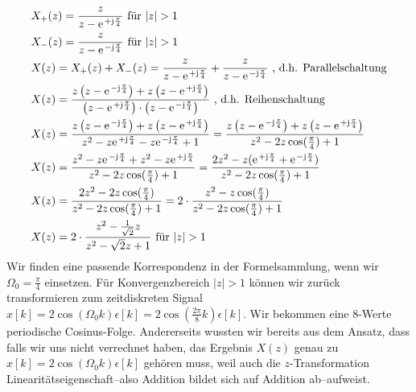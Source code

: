 \begin{ExCalc}
\begin{align}
&X_+(z) = \frac{z}{z-\e^{+\im\frac{\pi}{4}}}\text{ für } |z|>1 \\
&X_-(z) = \frac{z}{z-\e^{-\im\frac{\pi}{4}}}\text{ für } |z|>1 \\
&X(z) = X_+(z) + X_-(z) = \frac{z}{z-\e^{+\im\frac{\pi}{4}}} + \frac{z}{z-\e^{-\im\frac{\pi}{4}}}\text{ , d.h. Parallelschaltung}\\
&X(z) = \frac{z \left(z-\e^{-\im\frac{\pi}{4}}\right) + z \left(z-\e^{+\im\frac{\pi}{4}}\right)}
{\left(z-\e^{+\im\frac{\pi}{4}}\right)\cdot \left(z-\e^{-\im\frac{\pi}{4}}\right)}\text{ , d.h. Reihenschaltung}\\
&X(z)  = \frac{z \left(z-\e^{-\im\frac{\pi}{4}}\right) + z \left(z-\e^{+\im\frac{\pi}{4}}\right)}
{z^2 - z \e^{+\im\frac{\pi}{4}} - z \e^{-\im\frac{\pi}{4}} + 1}=
\frac{z \left(z-\e^{-\im\frac{\pi}{4}}\right) + z \left(z-\e^{+\im\frac{\pi}{4}}\right)}
{z^2 - 2 z \cos(\frac{\pi}{4}) + 1}\\
&X(z) = \frac{z^2 - z \e^{-\im\frac{\pi}{4}} + z^2 - z \e^{+\im\frac{\pi}{4}}}
{z^2 - 2 z \cos(\frac{\pi}{4}) + 1} =
\frac{2 z^2 - z (\e^{+\im\frac{\pi}{4}} + \e^{-\im\frac{\pi}{4}} )}
{z^2 - 2 z \cos(\frac{\pi}{4}) + 1}\\
&X(z) =\frac{2 z^2 - 2 z \cos(\frac{\pi}{4})}{z^2 - 2 z \cos(\frac{\pi}{4}) + 1}=
2 \cdot \frac{z^2 - z \cos(\frac{\pi}{4})}{z^2 - 2 z \cos(\frac{\pi}{4}) + 1}\\
&X(z) = 2 \cdot \frac{z^2-\frac{1}{\sqrt{2}} z}{z^2-\sqrt{2} z +1}\text{ für } |z|>1
\end{align}
%
Wir finden eine passende Korrespondenz in der Formelsammlung, wenn wir
$\Omega_0=\frac{\pi}{4}$ einsetzen. Für Konvergenzbereich $|z|>1$ können wir
zurück transformieren zum zeitdiskreten Signal
$x[k] = 2\cos(\Omega_0 k) \epsilon[k] = 2 \cos(\frac{2\pi}{8} k) \epsilon[k]$.
Wir bekommen eine 8-Werte periodische Cosinus-Folge.
%
Andererseits wussten wir bereits aus dem Ansatz, dass falls wir uns nicht
verrechnet haben, das Ergebnis $X(z)$ genau zu
$x[k] = 2\cos(\Omega_0 k) \epsilon[k]$ gehören muss,
weil auch die $z$-Transformation Linearitätseigenschaft--also Addition bildet sich
auf Addition ab--aufweist.


\end{ExCalc}
